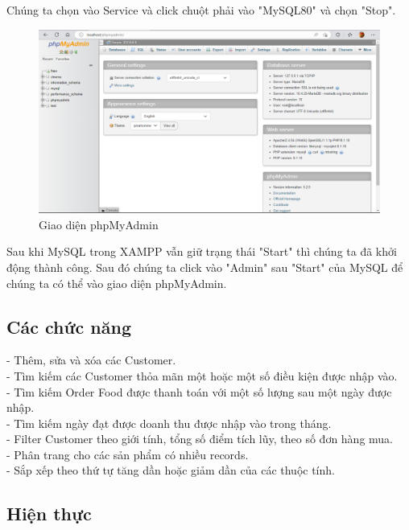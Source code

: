 Chúng ta chọn vào Service và click chuột phải vào "MySQL80" và chọn "Stop".

\begin{figure}[H]
    \centering
    \includegraphics[scale=0.45]{images/phpAdmin.png}
    \caption{Giao diện phpMyAdmin}
\end{figure}
Sau khi MySQL trong XAMPP vẫn giữ trạng thái "Start" thì chúng ta đã khởi động thành công. Sau đó chúng ta click vào "Admin" sau "Start" của MySQL để chúng ta có thể vào giao diện phpMyAdmin.

\subsection{Các chức năng}
- Thêm, sửa và xóa các Customer.\\
- Tìm kiếm các Customer thỏa mãn một hoặc một số điều kiện được nhập vào.\\
- Tìm kiếm Order Food được thanh toán với một số lượng sau một ngày được nhập.\\
- Tìm kiếm ngày đạt được doanh thu được nhập vào trong tháng.\\
- Filter Customer theo giới tính, tổng số điểm tích lũy, theo số đơn hàng mua.\\
- Phân trang cho các sản phẩm có nhiều records.\\
- Sắp xếp theo thứ tự tăng dần hoặc giảm dần của các thuộc tính.\\

\subsection{Hiện thực}
